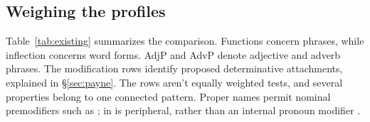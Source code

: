 \documentclass[12pt]{article}
\begin{document}
\subsection{Weighing the profiles}\label{sec:membership}

Table~\ref{tab:existing} summarizes the comparison. Functions concern phrases, while inflection concerns word forms. AdjP and AdvP denote adjective and adverb phrases. The modification rows identify proposed determinative attachments, explained in §\ref{sec:payne}. The rows aren't equally weighted tests, and several properties belong to one connected pattern. Proper names permit nominal premodifiers such as ;  in  is peripheral, rather than an internal pronoun modifier \citep[429--430, 519--520]{huddleston2002}.
\end{document}
